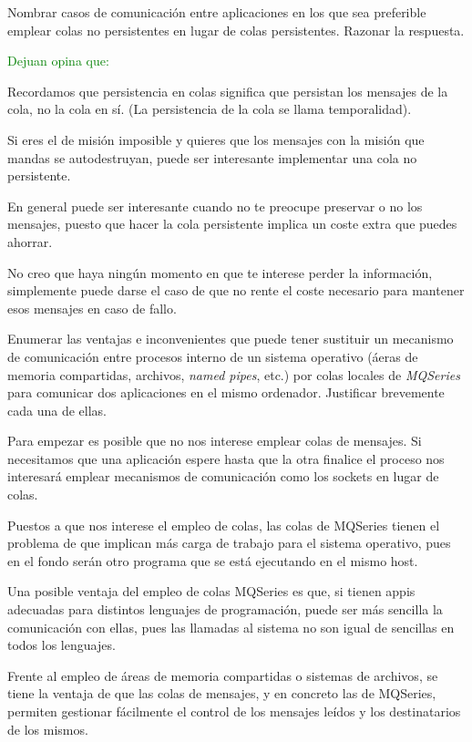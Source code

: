   \begin{problem}[8]
  Nombrar casos de comunicación entre aplicaciones en los que sea
preferible emplear colas no persistentes en lugar de colas persistentes.
Razonar la respuesta.
  \solution

\textcolor{green}{Dejuan opina que:}

Recordamos que persistencia en colas significa que persistan los mensajes de la cola, no la cola en sí. (La persistencia de la cola se llama temporalidad).

Si eres el de misión imposible y quieres que los mensajes con la misión que mandas se autodestruyan, puede ser interesante implementar una cola no persistente.

\yoP

En general puede ser interesante cuando no te preocupe preservar o no los mensajes, puesto que hacer la cola persistente implica un coste extra que puedes ahorrar.

No creo que haya ningún momento en que te interese perder la información, simplemente puede darse el caso de que no rente el coste necesario para mantener esos mensajes en caso de fallo.


  \end{problem}

  \begin{problem}[9]
  Enumerar las ventajas e inconvenientes que puede tener sustituir un mecanismo
  de comunicación entre procesos interno de un sistema operativo (áeras
  de memoria compartidas, archivos, \textit{named pipes}, etc.) por colas locales
de \textit{MQSeries} para comunicar dos aplicaciones en el mismo ordenador.
Justificar brevemente cada una de ellas.
  \solution

  \yoP

  Para empezar es posible que no nos interese emplear colas de mensajes. Si necesitamos que una aplicación espere hasta que la otra finalice el proceso nos interesará emplear mecanismos de comunicación como los sockets en lugar de colas.

  Puestos a que nos interese el empleo de colas, las colas de MQSeries tienen el problema de que implican más carga de trabajo para el sistema operativo, pues en el fondo serán otro programa que se está ejecutando en el mismo host.

  Una posible ventaja del empleo de colas MQSeries es que, si tienen appis adecuadas para distintos lenguajes de programación, puede ser más sencilla la comunicación con ellas, pues las llamadas al sistema no son igual de sencillas en todos los lenguajes.

  Frente al empleo de áreas de memoria compartidas o sistemas de archivos, se tiene la ventaja de que las colas de mensajes, y en concreto las de MQSeries, permiten gestionar fácilmente el control de los mensajes leídos y los destinatarios de los mismos.


  \end{problem}

